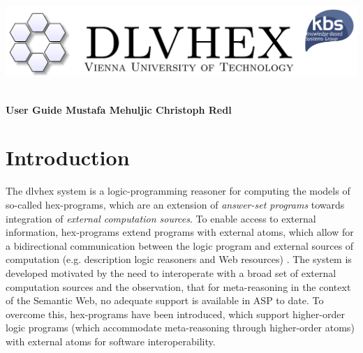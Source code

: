 \documentclass[14pt,a4paper, titlepage]{article}
\begin{document}
\setcounter{page}{3}
\newcommand{\dlvhex}{{\sc dlvhex}}
\newcommand{\hex}{{\sc hex}}
\setcounter{secnumdepth}{4} %
\setcounter{tocdepth}{4}    %

\newtheorem{exmp}{Example}[section]


\begin{titlepage}
    \centering
    \vfill
    \includegraphics[width=16cm,height=4.5cm,scale=1.5]{biglogo_whitebg}
    \vfill
    {\bfseries\Large
        User Guide
        \vskip4cm
        Mustafa Mehuljic \vskip1cm Christoph Redl
    }    
    
\end{titlepage}

\begin{abstract}
This document provides a user guide for the Answer Set Programming (ASP) system called \dlvhex{} developed at Vienna University of Technology. ASP is a declarative problem solving paradigm, rooted in logic programming and nonmonotonic reasoning, which has been gaining increasing attention during the last years. The \dlvhex{} system is a reasoner for computing the models of so-called \hex{}-programs, which are an extension of \emph{answer-set programs} towards integration of \emph{external computation sources}. This guide aims at enabling users of this system to interoperate with a broad set of external computation sources. The guide refers to release 2.4.     
\end{abstract}

\tableofcontents
\newpage

\section{Introduction} %
The \dlvhex{} system is a logic-programming reasoner for computing the models of so-called \hex{}-programs, which are an extension of \emph{answer-set programs} towards integration of \emph{external computation sources}. To enable access to external information, \hex{}-programs extend programs with external atoms, which allow for a bidirectional communication between the logic program and external sources of computation (e.g. description logic reasoners and Web resources) \cite{extatoms}. The system is developed motivated by the need to interoperate with a broad set of external computation sources and the observation, that for meta-reasoning in the context of the Semantic Web, no adequate support is available in ASP to date. To overcome this, \hex{}-programs have been introduced, which support higher-order logic programs (which accommodate meta-reasoning through higher-order atoms) with external atoms for software interoperability.
\end{document}

